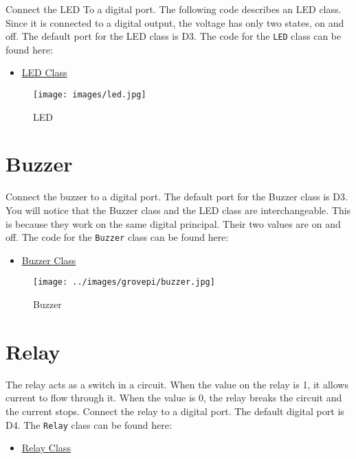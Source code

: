 Connect the LED To a digital port. The following code describes an LED
class. Since it is connected to a digital output, the voltage has only
two states, on and off. The default port for the LED class is D3. The
code for the \texttt{LED} class can be found here:

\begin{itemize}

\item
  \href{https://github.com/cloudmesh/cloudmesh.pi/blob/master/cloudmesh/pi/led.py}{LED
  Class}
\end{itemize}

\begin{figure}
\centering
\texttt{[image: images/led.jpg]}
\caption{LED}
\end{figure}

\section{Buzzer}\label{buzzer}

Connect the buzzer to a digital port. The default port for the Buzzer
class is D3. You will notice that the Buzzer class and the LED class are
interchangeable. This is because they work on the same digital
principal. Their two values are on and off. The code for the
\texttt{Buzzer} class can be found here:

\begin{itemize}

\item
  \href{https://github.com/cloudmesh/cloudmesh.pi/blob/master/cloudmesh/pi/buzzer.py}{Buzzer
  Class}
\end{itemize}

\begin{figure}
\centering
\texttt{[image: ../images/grovepi/buzzer.jpg]}
\caption{Buzzer}
\end{figure}

\section{Relay}\label{relay}

The relay acts as a switch in a circuit. When the value on the relay is
1, it allows current to flow through it. When the value is 0, the relay
breaks the circuit and the current stops. Connect the relay to a digital
port. The default digital port is D4. The \texttt{Relay} class can be
found here:

\begin{itemize}

\item
  \href{https://github.com/cloudmesh/cloudmesh.pi/blob/master/cloudmesh/pi/relay.py}{Relay
  Class}
\end{itemize}

